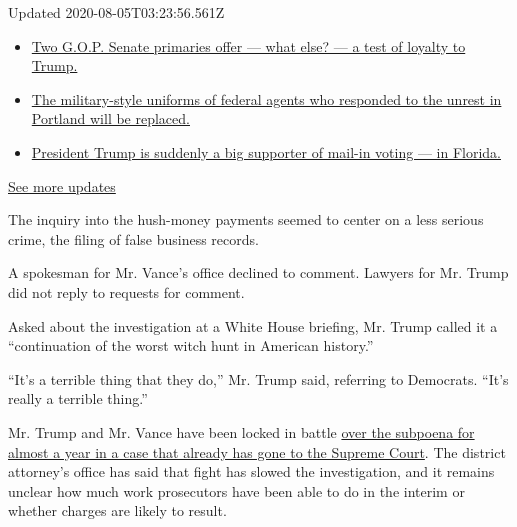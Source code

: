 Updated 2020-08-05T03:23:56.561Z

\begin{itemize}
\tightlist
\item
  \href{https://www.nytimes3xbfgragh.onion/2020/08/04/us/elections/primary-election-michigan-arizona-kansas.html?action=click\&pgtype=Article\&state=default\&region=MAIN_CONTENT_1\&context=storylines_live_updates\#link-3924dd44}{Two
  G.O.P. Senate primaries offer --- what else? --- a test of loyalty to
  Trump.}
\item
  \href{https://www.nytimes3xbfgragh.onion/2020/08/04/us/elections/primary-election-michigan-arizona-kansas.html?action=click\&pgtype=Article\&state=default\&region=MAIN_CONTENT_1\&context=storylines_live_updates\#link-62a8e06b}{The
  military-style uniforms of federal agents who responded to the unrest
  in Portland will be replaced.}
\item
  \href{https://www.nytimes3xbfgragh.onion/2020/08/04/us/elections/primary-election-michigan-arizona-kansas.html?action=click\&pgtype=Article\&state=default\&region=MAIN_CONTENT_1\&context=storylines_live_updates\#link-32b39e33}{President
  Trump is suddenly a big supporter of mail-in voting --- in Florida.}
\end{itemize}

\href{https://www.nytimes3xbfgragh.onion/2020/08/04/us/elections/primary-election-michigan-arizona-kansas.html?action=click\&pgtype=Article\&state=default\&region=MAIN_CONTENT_1\&context=storylines_live_updates}{See
more updates}

The inquiry into the hush-money payments seemed to center on a less
serious crime, the filing of false business records.

A spokesman for Mr. Vance's office declined to comment. Lawyers for Mr.
Trump did not reply to requests for comment.

Asked about the investigation at a White House briefing, Mr. Trump
called it a ``continuation of the worst witch hunt in American
history.''

``It's a terrible thing that they do,'' Mr. Trump said, referring to
Democrats. ``It's really a terrible thing.''

Mr. Trump and Mr. Vance have been locked in battle
\href{https://www.nytimes3xbfgragh.onion/interactive/2018/10/02/us/politics/donald-trump-tax-schemes-fred-trump.html}{over
the subpoena for almost a year in a case that already has gone to the
Supreme Court}. The district attorney's office has said that fight has
slowed the investigation, and it remains unclear how much work
prosecutors have been able to do in the interim or whether charges are
likely to result.

